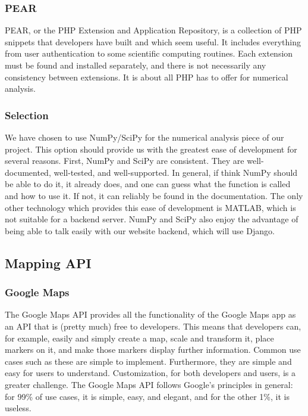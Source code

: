 \subsubsection{PEAR}
PEAR, or the PHP Extension and Application Repository, is a collection of PHP snippets that developers have built and which seem useful. 
It includes everything from user authentication to some scientific computing routines. 
Each extension must be found and installed separately, and there is not necessarily any consistency between extensions. 
It is about all PHP has to offer for numerical analysis.

\subsubsection{Selection}
We have chosen to use NumPy/SciPy for the numerical analysis piece of our project. 
This option should provide us with the greatest ease of development for several reasons. 
First, NumPy and SciPy are consistent. 
They are well-documented, well-tested, and well-supported. 
In general, if think NumPy should be able to do it, it already does, and one can guess what the function is called and how to use it. 
If not, it can reliably be found in the documentation. 
The only other technology which provides this ease of development is MATLAB, which is not suitable for a backend server. 
NumPy and SciPy also enjoy the advantage of being able to talk easily with our website backend, which will use Django.


\subsection{Mapping API}

\subsubsection{Google Maps}
The Google Maps API provides all the functionality of the Google Maps app as an API that is (pretty much) free to developers. 
This means that developers can, for example, easily and simply create a map, scale and transform it, place markers on it, and make those markers display further information. 
Common use cases such as these are simple to implement. 
Furthermore, they are simple and easy for users to understand. 
Customization, for both developers and users, is a greater challenge. 
The Google Maps API follows Google’s principles in general: for 99\% of use cases, it is simple, easy, and elegant, and for the other 1\%, it is useless.

